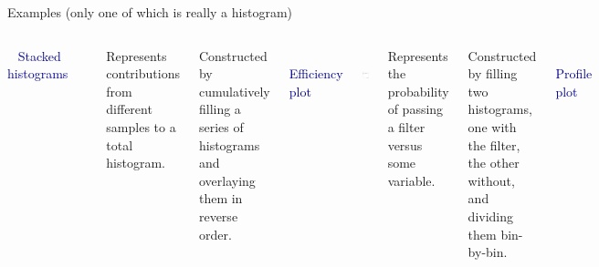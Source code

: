 \documentclass[aspectratio=169]{beamer}
\begin{document}
\begin{frame}{Examples (only one of which is really a histogram)}
\vspace{0.5 cm}
\begin{columns}
\mbox{ } \hfill \hfill \hfill \textcolor{darkblue}{Stacked histograms} \hfill \mbox{ }

\includegraphics[height=3.5 cm]{dileptons_fig_01b_mumu.png}

Represents contributions from different samples to a total histogram.

\vspace{0.25 cm}
\begin{minipage}{\linewidth}
\scriptsize Constructed by cumulatively filling a series of histograms and overlaying them in reverse order.
\end{minipage}

\mbox{ } \hfill \hfill \textcolor{darkblue}{Efficiency plot} \hfill \mbox{ }

\mbox{ } \hfill \includegraphics[height=3.5 cm]{efficiency.png} \hfill \mbox{ }

Represents the probability of passing a filter versus some variable.

\vspace{0.25 cm}
\begin{minipage}{\linewidth}
\scriptsize Constructed by filling two histograms, one with the filter, the other without, and dividing them bin-by-bin.
\end{minipage}

\mbox{ } \hfill \textcolor{darkblue}{Profile plot} \hfill \mbox{ }

\mbox{\hspace{-0.25 cm}}\includegraphics[height=3.5 cm]{profile_plot.png}


\end{columns}
\end{frame}
\end{document}

